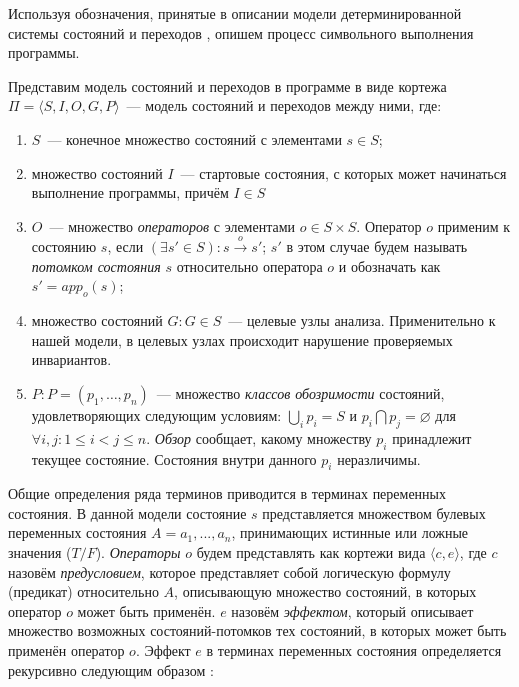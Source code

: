 Используя обозначения, принятые в описании модели детерминированной системы состояний и переходов \cite{transition-sys}, опишем процесс символьного выполнения программы.

Представим модель состояний и переходов в программе в виде кортежа $\Pi = \langle S, I, O, G, P\rangle$~--- модель состояний и переходов между ними, где:
\begin{enumerate}
 \item $S$~--- конечное множество состояний с элементами $s \in S$;
 \item множество состояний $I$~--- стартовые состояния, с которых может начинаться выполнение программы, причём $I \in S$
 \item $O$~--- множество \textit{операторов} с элементами $o \in S \times S$. Оператор $o$ применим к состоянию $s$, если $(\exists s' \in S): s \xrightarrow{o} s'$; $s'$ в этом случае будем называть \textit{потомком состояния} $s$ относительно оператора $o$ и обозначать как $s' = app_o(s)$;
 \item множество состояний $G: G \in S$~--- целевые узлы анализа. Применительно к нашей модели, в целевых узлах происходит нарушение проверяемых инвариантов.
 \item $P: P = (p_1, \ldots, p_n)$~--- множество \textit{классов обозримости} состояний, удовлетворяющих следующим условиям: $\bigcup_i {p_i} = S$ и $p_i \bigcap p_j = \varnothing$ для $\forall i, j: 1 \leqslant i < j \leqslant n$. \textit{Обзор} сообщает, какому множеству $p_i$ принадлежит текущее состояние. Состояния внутри данного $p_i$ неразличимы.
\end{enumerate}

Общие определения ряда терминов приводится в терминах переменных состояния. В данной модели состояние $s$ представляется множеством булевых переменных состояния $A = a_1, ..., a_n$, принимающих истинные или ложные значения ($T/F$). \textit{Операторы} $o$ будем представлять как кортежи вида $\langle c, e \rangle$, где $c$ назовём \textit{предусловием}, которое представляет собой логическую формулу (предикат) относительно $A$, описывающую множество состояний, в которых оператор $o$ может быть применён. $e$ назовём \textit{эффектом}, который описывает множество возможных состояний-потомков тех состояний, в которых может быть применён оператор $o$. Эффект $e$ в терминах переменных состояния определяется рекурсивно следующим образом \cite{transition-sys}:

